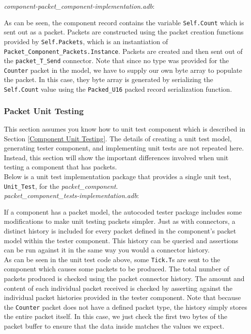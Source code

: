 \textit{component-packet\_component-implementation.adb}:

As can be seen, the component record contains the variable \texttt{Self.Count} which is sent out as a packet. Packets are constructed using the packet creation functions provided by \texttt{Self.Packets}, which is an instantiation of \texttt{Packet\_Component\_Packets.Instance}. Packets are created and then sent out of the \texttt{packet\_T\_Send} connector. Note that since no type was provided for the \texttt{Counter} packet in the model, we have to supply our own byte array to populate the packet. In this case, they byte array is generated by serializing the \texttt{Self.Count} value using the \texttt{Packed\_U16} packed record serialization function.

\subsubsection{Packet Unit Testing}

This section assumes you know how to unit test component which is described in Section \ref{Component Unit Testing}. The details of creating a unit test model, generating tester component, and implementing unit tests are not repeated here. Instead, this section will show the important differences involved when unit testing a component that has packets. \\

Below is a unit test implementation package that provides a single unit test, \texttt{Unit\_Test}, for the \textit{packet\_component}. \\

\textit{packet\_component\_tests-implementation.adb}:

If a component has a packet model, the autocoded tester package includes some modifications to make unit testing packets simpler. Just as with connectors, a distinct history is included for every packet defined in the component's packet model within the tester component. This history can be queried and assertions can be run against it in the same way you would a connector history. \\

As can be seen in the unit test code above, some \texttt{Tick.T}s are sent to the component which causes some packets to be produced. The total number of packets produced is checked using the packet connector history. The amount and content of each individual packet received is checked by asserting against the individual packet histories provided in the tester component. Note that because the \texttt{Counter} packet does not have a defined packet type, the history simply stores the entire packet itself. In this case, we just check the first two bytes of the packet buffer to ensure that the data inside matches the values we expect. \\

